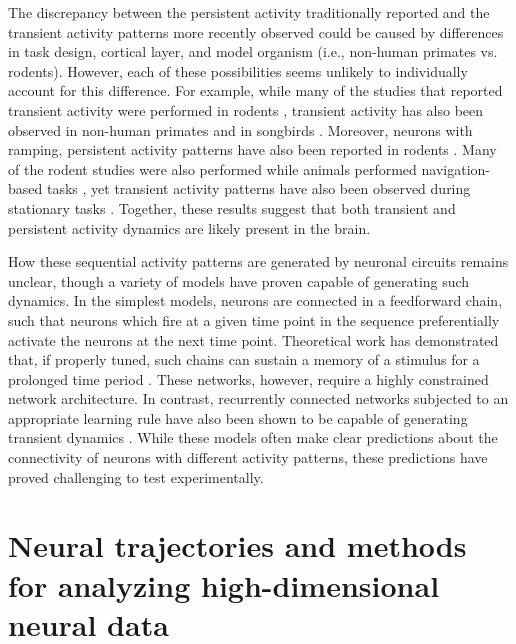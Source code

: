\bigskip
The discrepancy between the persistent activity traditionally reported and the transient activity patterns more recently observed could be caused by differences in task design, cortical layer, and model organism (i.e., non-human primates vs. rodents). However, each of these possibilities seems unlikely to individually account for this difference. For example, while many of the studies that reported transient activity were performed in rodents \citep{Harvey:2012du, Pastalkova:2008hz, Fujisawa:2008dm}, transient activity has also been observed in non-human primates \citep{Crowe:2010du} and in songbirds \citep{Hahnloser:2002hj}. Moreover, neurons with ramping, persistent activity patterns have also been reported in rodents \citep{Hanks:2015fy, Raposo:2014df}. Many of the rodent studies were also performed while animals performed navigation-based tasks \citep{Harvey:2012du, Pastalkova:2008hz, Fujisawa:2008dm}, yet transient activity patterns have also been observed during stationary tasks \citep{Crowe:2010du}. Together, these results suggest that both transient and persistent activity dynamics are likely present in the brain. 

\bigskip
How these sequential activity patterns are generated by neuronal circuits remains unclear, though a variety of models have proven capable of generating such dynamics. In the simplest models, neurons are connected in a feedforward chain, such that neurons which fire at a given time point in the sequence preferentially activate the neurons at the next time point. Theoretical work has demonstrated that, if properly tuned, such chains can sustain a memory of a stimulus for a prolonged time period \citep{Goldman:2009ko}. These networks, however, require a highly constrained network architecture. In contrast, recurrently connected networks subjected to an appropriate learning rule have also been shown to be capable of generating transient dynamics \citep{Rajan:2016cp, Klampfl:2013gq}. While these models often make clear predictions about the connectivity of neurons with different activity patterns, these predictions have proved challenging to test experimentally. 

\section{Neural trajectories and methods for analyzing high-dimensional neural data} \label{intro:neural_traj}

